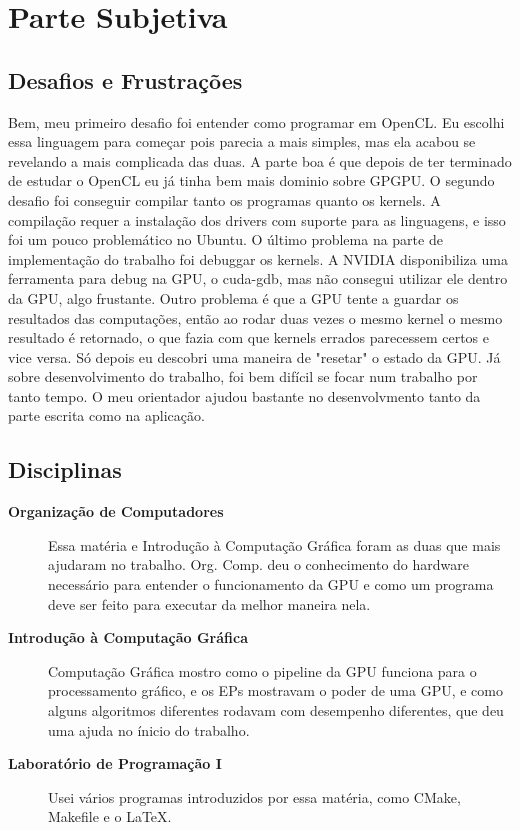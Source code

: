 \section{Parte Subjetiva}

\subsection{Desafios e Frustrações}

Bem, meu primeiro desafio foi entender como programar em OpenCL. Eu escolhi essa linguagem para começar
pois parecia a mais simples, mas ela acabou se revelando a mais complicada das duas. A parte boa é que
depois de ter terminado de estudar o OpenCL eu já tinha bem mais dominio sobre GPGPU. O segundo desafio
foi conseguir compilar tanto os programas quanto os kernels. A compilação requer a instalação dos drivers
com suporte para as linguagens, e isso foi um pouco problemático no Ubuntu. O último problema na parte de
implementação do trabalho foi debuggar os kernels. A NVIDIA disponibiliza uma ferramenta para debug na GPU,
o cuda-gdb, mas não consegui utilizar ele dentro da GPU, algo frustante. Outro problema é que a GPU tente
a guardar os resultados das computações, então ao rodar duas vezes o mesmo kernel o mesmo resultado é retornado,
o que fazia com que kernels errados parecessem certos e vice versa. Só depois eu descobri uma maneira de
"resetar" o estado da GPU. Já sobre desenvolvimento do trabalho, foi bem difícil se focar num trabalho por
tanto tempo. O meu orientador ajudou bastante no desenvolvmento tanto da parte escrita como na aplicação.

\subsection{Disciplinas}

\begin{description}
  \item[\textbf{Organização de Computadores}] Essa matéria e Introdução à Computação Gráfica foram as duas que mais ajudaram no trabalho.
      Org. Comp. deu o conhecimento do hardware necessário para entender o funcionamento da GPU e como um programa deve
      ser feito para executar da melhor maneira nela.
  \item[\textbf{Introdução à Computação Gráfica}] Computação Gráfica mostro como o pipeline da GPU funciona para o processamento gráfico,
      e os EPs mostravam o poder de uma GPU, e como alguns algoritmos diferentes rodavam com desempenho diferentes, que deu uma ajuda
      no ínicio do trabalho.
  \item[\textbf{Laboratório de Programação I}] Usei vários programas introduzidos por essa matéria, como CMake, Makefile e o LaTeX.
\end{description}

